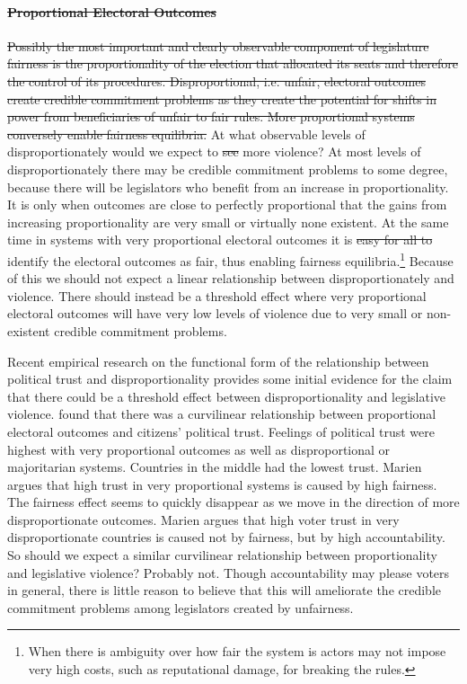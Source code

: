 \documentclass[a4paper]{article}\usepackage[]{graphicx}\usepackage[]{color}
\providecommand{\DIFaddtex}[1]{{\protect\color{blue}\uwave{#1}}} %
\providecommand{\DIFdeltex}[1]{{\protect\color{red}\sout{#1}}}                      %
\providecommand{\DIFaddbegin}{} %
\providecommand{\DIFaddend}{} %
\providecommand{\DIFdelbegin}{} %
\providecommand{\DIFdelend}{} %
\providecommand{\DIFadd}[1]{\texorpdfstring{\DIFaddtex{#1}}{#1}} %
\providecommand{\DIFdel}[1]{\texorpdfstring{\DIFdeltex{#1}}{}} %
\begin{document}
\paragraph{\DIFdel{Proportional Electoral Outcomes}}
\addtocounter{paragraph}{-1}%

\DIFdel{Possibly the most important and clearly observable component of legislature fairness is the proportionality of the election that allocated its seats and therefore the control of its procedures. Disproportional, i.e. unfair, electoral outcomes create credible commitment problems as they create the potential for shifts in power from beneficiaries of unfair to fair rules. More proportional systems conversely enable fairness equilibria. }\DIFdelend At what observable levels of disproportionately would we expect to \DIFdelbegin \DIFdel{see }\DIFdelend \DIFaddbegin \DIFadd{empirically observe }\DIFaddend more violence? At most levels of disproportionately there may be credible commitment problems to some degree, because there will be legislators who benefit from an increase in proportionality. It is only when outcomes are close to perfectly proportional that the gains from increasing proportionality are very small or virtually none existent. At the same time in systems with very proportional electoral outcomes it is \DIFdelbegin \DIFdel{easy for all to }\DIFdelend \DIFaddbegin \DIFadd{more likely that all sides }\DIFaddend identify the electoral outcomes as fair, thus enabling fairness equilibria.\footnote{When there is ambiguity over how fair the system is actors may not impose very high costs, such as reputational damage, for breaking the rules.} Because of this we should not expect a linear relationship between disproportionately and violence. There should instead be a threshold effect where very proportional electoral outcomes will have very low levels of violence due to very small or non-existent credible commitment problems.

Recent empirical research on the functional form of the relationship between political trust and disproportionality provides some initial evidence for the claim that there could be a threshold effect between disproportionality and legislative violence. \cite{Marien2011} found that there was a curvilinear relationship between proportional electoral outcomes and citizens' political trust. Feelings of political trust were highest with very proportional outcomes as well as disproportional or majoritarian systems. Countries in the middle had the lowest trust. Marien argues that high trust in very proportional systems is caused by high fairness. The fairness effect seems to quickly disappear as we move in the direction of more disproportionate outcomes. Marien argues that high voter trust in very disproportionate countries is caused not by fairness, but by high accountability. So should we expect a similar curvilinear relationship between proportionality and legislative violence? Probably not. Though accountability may please voters in general, there is little reason to believe that this will ameliorate the credible commitment problems among legislators created by unfairness. \DIFdelbegin %
\end{document}
